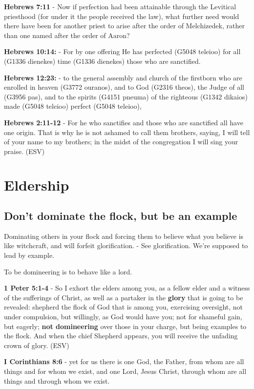 \documentclass[11pt]{article}
\begin{document}
\textbf{Hebrews 7:11} - Now if perfection had been attainable through the Levitical priesthood (for under it the people received the law), what further need would there have been for another priest to arise after the order of Melchizedek, rather than one named after the order of Aaron?

\textbf{Hebrews 10:14:} - For by one offering He has perfected (G5048 teleioo) for all (G1336 dienekes) time (G1336 dienekes) those who are sanctified.

\textbf{Hebrews 12:23:} - to the general assembly and church of the firstborn who are enrolled in heaven (G3772 ouranos), and to God (G2316 theos), the Judge of all (G3956 pas), and to the spirits (G4151 pneuma) of the righteous (G1342 dikaios) made (G5048 teleioo) perfect (G5048 teleioo),

\textbf{Hebrews 2:11-12} -  For he who sanctifies and those who are sanctified all have one origin.  That is why he is not ashamed to call them brothers, saying, I will tell of your name to my brothers; in the midst of the congregation I will sing your praise.  (ESV)

\section{Eldership}
\label{sec:org05d133f}
\subsection{Don't dominate the flock, but be an example}
\label{sec:org737f723}
Dominating others in your flock and forcing them to believe what you believe is like witchcraft, and will forfeit glorification. - See glorification.
We're supposed to lead by example.

To be domineering is to behave like a lord.

\textbf{1 Peter 5:1-4} - So I exhort the elders among you, as a fellow elder and a witness of the sufferings of Christ, as well as a partaker in the \textbf{glory} that is going to be revealed: shepherd the flock of God that is among you, exercising oversight, not under compulsion, but willingly, as God would have you; not for shameful gain, but eagerly; \textbf{not domineering} over those in your charge, but being examples to the flock. And when the chief Shepherd appears, you will receive the unfading crown of glory. (ESV)

\textbf{I Corinthians 8:6} - yet for us there is one God, the Father, from whom are all things and for whom we exist, and one Lord, Jesus Christ, through whom are all things and through whom we exist.
\end{document}

